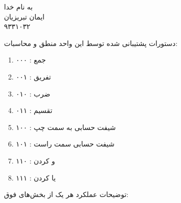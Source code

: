 \documentclass{article}[12pt]
\begin{document}
\begin{centering}
به نام خدا\\
ایمان تبریزیان\\
۹۳۳۱۰۳۲\\
\end{centering}


دستورات پشتیبانی شده توسط این واحد منطق و محاسبات:
\begin{enumerate}
\item ۰۰۰ : جمع
\item ۰۰۱ :‌ تفریق
\item ۰۱۰ : ضرب
\item ۰۱۱ : تقسیم
\item ۱۰۰ : شیفت حسابی به سمت چپ
\item ۱۰۱ : شیفت حسابی سمت راست
\item ۱۱۰ : و کردن
\item ۱۱۱ : یا کردن
\end{enumerate}
توضیحات عملکرد هر یک از بخش‌های فوق:\\
\end{document}
